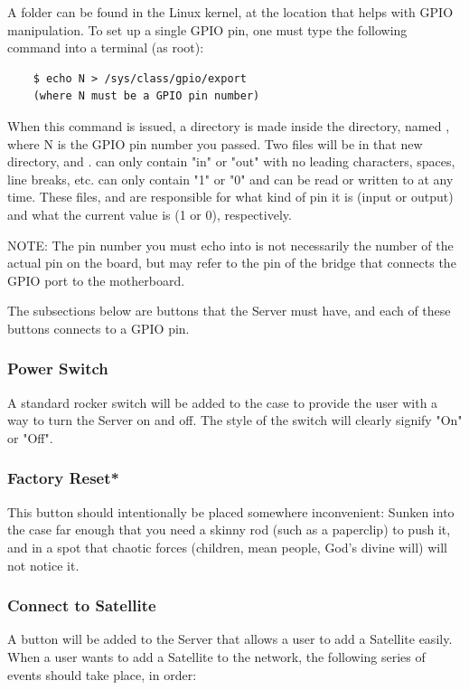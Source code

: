 A folder can be found in the Linux kernel, at the location  that helps with GPIO manipulation. 
To set up a single GPIO pin, one must type the following command into a terminal (as root):

\begin{lstlisting}
	$ echo N > /sys/class/gpio/export
	(where N must be a GPIO pin number)
\end{lstlisting}

When this command is issued, a directory is made inside the  directory, named , where N is the GPIO pin number you passed. 
Two files will be in that new directory,  and . 
 can only contain "in" or "out" with no leading characters, spaces, line breaks, etc.
 can only contain "1" or "0" and can be read or written to at any time.
These files,  and  are responsible for what kind of pin it is (input or output) and what the current value is (1 or 0), respectively.

NOTE: The pin number you must echo into  is not necessarily the number of the actual pin on the board, but may refer to the pin of the bridge that connects the GPIO port to the motherboard.

The subsections below are buttons that the Server must have, and each of these buttons connects to a GPIO pin.


\subsubsection{Power Switch}
A standard rocker switch will be added to the case to provide the user with a way to turn the Server on and off. 
The style of the switch will clearly signify "On" or "Off".

\subsubsection{Factory Reset*}
This button should intentionally be placed somewhere inconvenient: 
Sunken into the case far enough that you need a skinny rod (such as a paperclip) to push it, and in a spot
that chaotic forces (children, mean people, God's divine will) will not notice it.

\subsubsection{Connect to Satellite}
A button will be added to the Server that allows a user to add a Satellite easily.
When a user wants to add a Satellite to the network, the following series of events should take place, in order:

